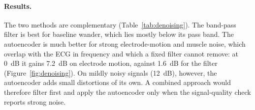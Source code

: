 \paragraph{Results.} The two methods are complementary (Table~\ref{tab:denoising}). The band-pass filter is best for baseline wander, which lies mostly below its pass band. The autoencoder is much better for strong electrode-motion and muscle noise, which overlap with the ECG in frequency and which a fixed filter cannot remove: at 0~dB it gains 7.2~dB on electrode motion, against 1.6~dB for the filter (Figure~\ref{fig:denoising}). On mildly noisy signals (12~dB), however, the autoencoder adds small distortions of its own. A combined approach would therefore filter first and apply the autoencoder only when the signal-quality check reports strong noise.
